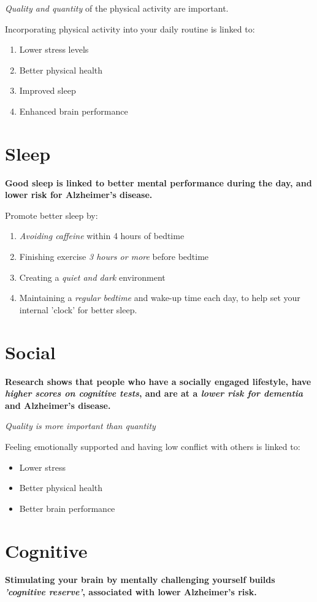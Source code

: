 \textit{Quality and quantity} of the physical activity are important. 

Incorporating physical activity into your daily routine is linked to:
\begin{enumerate}
	\item Lower stress levels
	\item Better physical health
	\item Improved sleep
	\item Enhanced brain performance
\end{enumerate}

\section{Sleep}
\textbf{Good sleep is linked to better mental performance during the day, and lower risk for Alzheimer's disease.}

Promote better sleep by:  
\begin{enumerate}
	\item \textit{Avoiding caffeine} within 4 hours of bedtime 
	\item Finishing exercise \textit{3 hours or more} before bedtime 
	\item Creating a \textit{quiet and dark} environment
	\item Maintaining a \textit{regular bedtime} and wake-up time each day, to help set your internal 'clock' for better sleep.
\end{enumerate}

\section{Social}
\textbf{Research shows that people who have a socially engaged lifestyle, have \textit{higher scores on cognitive tests}, and are at a \textit{lower risk for dementia} and Alzheimer's disease.}

\textit{Quality is more important than quantity}

Feeling emotionally supported and having low conflict with others is linked to:
\begin{itemize}
  \item Lower stress
  \item Better physical health
  \item Better brain performance
\end{itemize}

\section{Cognitive}
\textbf{Stimulating your brain by mentally challenging yourself builds \textit{'cognitive reserve'}, associated with lower Alzheimer's risk.}

